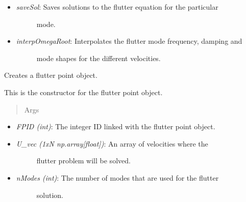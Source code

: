 \documentclass[letterpaper,10pt,english]{sphinxmanual}
\begin{document}
\begin{fulllineitems}
\begin{itemize}
\begin{description}
\end{description}

\item {} \begin{description}
\item[{\emph{saveSol}: Saves solutions to the flutter equation for the particular}] \leavevmode
mode.

\end{description}

\item {} \begin{description}
\item[{\emph{interpOmegaRoot}: Interpolates the flutter mode frequency, damping and}] \leavevmode
mode shapes for the different velocities.

\end{description}

\end{itemize}

\begin{fulllineitems}
\label{FEM:AeroComBAT.FEM.FlutterPoint.__init__}
Creates a flutter point object.

This is the constructor for the flutter point object.
\begin{quote}\begin{description}
\item[{Args}] \leavevmode
\end{description}\end{quote}
\begin{itemize}
\item {} 
\emph{FPID (int)}: The integer ID linked with the flutter point object.

\item {} \begin{description}
\item[{\emph{U\_vec (1xN np.array{[}float{]})}: An array of velocities where the}] \leavevmode
flutter problem will be solved.

\end{description}

\item {} \begin{description}
\item[{\emph{nModes (int)}: The number of modes that are used for the flutter}] \leavevmode
solution.


\end{description}
\end{itemize}
\end{fulllineitems}
\end{fulllineitems}
\end{document}
